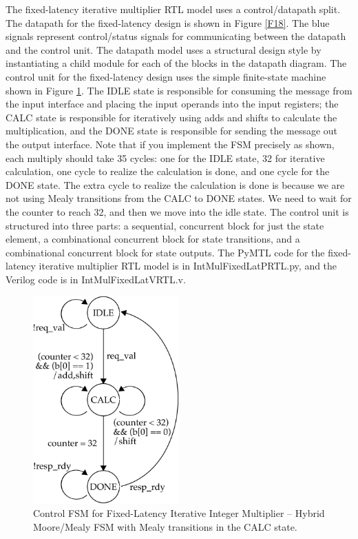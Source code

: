 \documentclass[a4paper,12pt,twoside]{article}
\begin{document}
The fixed-latency iterative multiplier RTL model uses a control/datapath split. The datapath for the fixed-latency design is shown in Figure \ref{F18}. The blue signals represent control/status signals for communicating between the datapath and the control unit. The datapath model uses a structural design style by instantiating a child module for each of the blocks in the datapath diagram. The control unit for the fixed-latency design uses the simple finite-state machine shown in Figure \ref{F19}. The IDLE state is responsible for consuming the message from the input interface and placing the input operands into the input registers; the CALC state is responsible for iteratively using adds and shifts to calculate the multiplication, and the DONE state is responsible for sending the message out the output interface. Note that if you implement the FSM precisely as shown, each multiply should take 35 cycles: one for the IDLE state, 32 for iterative calculation, one cycle to realize the calculation is done, and one cycle for the DONE state. The extra cycle to realize the calculation is done is because we are not using Mealy transitions from the CALC to DONE states. We need to wait for the counter to reach 32, and then we move into the idle state. The control unit is structured into three parts: a sequential, concurrent block for just the state element, a combinational concurrent block for state transitions, and a combinational concurrent block for state outputs. The PyMTL code for the fixed-latency iterative multiplier RTL model is in IntMulFixedLatPRTL.py, and the Verilog code is in IntMulFixedLatVRTL.v.
\begin{figure}[H]
    \centering
    \includegraphics[width=0.5\textwidth]{images/19.png}
    \caption{Control FSM for Fixed-Latency Iterative Integer Multiplier – Hybrid Moore/Mealy FSM with Mealy transitions in the CALC state.}
    \label{F19}
\end{figure}
\end{document}

